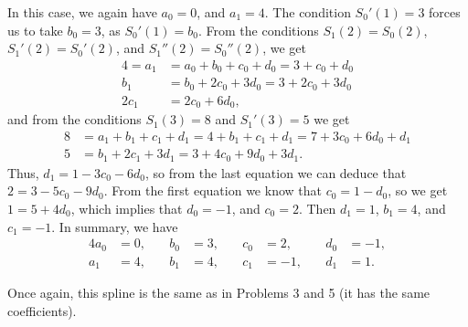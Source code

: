 \documentclass{homework}
\begin{document}
	\question
	\begin{alphaparts}
		\questionpart In this case, we again have $a_0 = 0$, and $a_1 = 4$. The condition $S_0'(1) = 3$ forces us to take $b_0 = 3$, as $S_0'(1) = b_0$. From the conditions $S_1(2) = S_0(2)$, $S_1'(2) = S_0'(2)$, and $S_1''(2) = S_0''(2)$, we get
		\begin{align*}
			4 = a_1 &= a_0 + b_0 + c_0 + d_0 = 3 + c_0  +d_0\\
			b_1 &= b_0 + 2c_0 + 3d_0 = 3 + 2c_0 + 3d_0\\
			2c_1 &= 2c_0 + 6d_0,
		\end{align*}
		and from the conditions $S_1(3) = 8$ and $S_1'(3) = 5$ we get
		\begin{align*}
			8 &= a_1 + b_1 + c_1 + d_1 = 4 + b_1 + c_1 + d_1 = 7 + 3c_0 + 6d_0 + d_1 \\
			5 &= b_1 + 2c_1 + 3d_1 = 3 + 4c_0 + 9d_0 + 3d_1.
		\end{align*}
		Thus, $d_1 = 1 - 3c_0 - 6d_0$, so from the last equation we can deduce that $2 = 3-5c_0 -9d_0$. From the first equation we know that $c_0 = 1-d_0$, so we get $1 = 5 +4d_0$, which implies that $d_0 = -1$, and $c_0 = 2$. Then $d_1 = 1$, $b_1 = 4$, and $c_1 = -1$. In summary, we have
		\begin{alignat*}{4}
			a_0 &= 0,& \quad b_0 &= 3,& \quad c_0 &= 2,& \quad d_0 &= -1,\\
			a_1 &= 4,& \quad b_1 &= 4,& \quad c_1 &= -1,&\quad d_1 &= 1.
		\end{alignat*}
		
		\questionpart Once again, this spline is the same as in Problems 3 and 5 (it has the same coefficients).
	\end{alphaparts}
	
\end{document}
